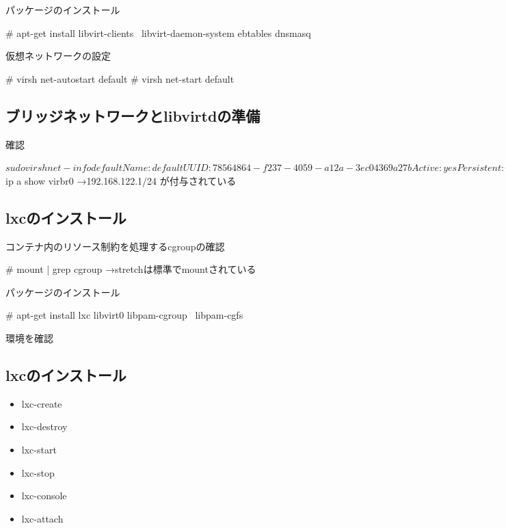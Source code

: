 \documentclass[mingoth,a4paper]{jsarticle}
\begin{document}
パッケージのインストール
\begin{commandline}
  # apt-get install libvirt-clients \
  libvirt-daemon-system ebtables dnsmasq
\end{commandline}

仮想ネットワークの設定
\begin{commandline}
  # virsh net-autostart default
  # virsh net-start default
\end{commandline}




\subsection[containsverbatim]{ブリッジネットワークとlibvirtdの準備}
確認
\begin{commandline}
  $ sudo virsh net-info default
  Name:           default
  UUID:           78564864-f237-4059-a12a-3ec04369a27b
  Active:         yes
  Persistent:     yes
  Autostart:      yes
  Bridge:         virbr0
  
  $ ip a show virbr0
  →192.168.122.1/24 が付与されている
\end{commandline}




\subsection[containsverbatim]{lxcのインストール}
  コンテナ内のリソース制約を処理するcgroupの確認
  \begin{commandline}
    # mount | grep cgroup
    →stretchは標準でmountされている
  \end{commandline}
  パッケージのインストール
  \begin{commandline}
    # apt-get install lxc libvirt0 libpam-cgroup \
    libpam-cgfs
  \end{commandline}
  環境を確認


\subsection[containsverbatim]{lxcのインストール}
  \begin{itemize}
  \item lxc-create
  \item lxc-destroy
  \item lxc-start
  \item lxc-stop
  \item lxc-console
  \item lxc-attach
  \end{itemize}
\end{document}
